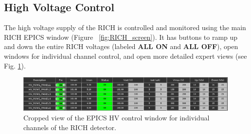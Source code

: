 \documentclass[12pt]{article}
\begin{document}
\subsection{ High Voltage Control}

The high voltage supply of the RICH is controlled and monitored using the main RICH
EPICS window (Figure ~\ref{fig:RICH_screen}).  It has buttons to ramp up and down the entire 
RICH voltages (labeled {\bf ALL ON} and {\bf ALL OFF}), open windows for
individual channel control, and open more detailed expert views (see Fig. \ref{HVControl}).
\begin{figure}[htbp]
\center
\includegraphics[width=0.99\textwidth]{Justin_plots/HVControlsNumbers.PNG}
\caption{ \label{HVControl} Cropped view of the EPICS HV control window for individual channels of the RICH detector.}
\end{figure}




\end{document}
